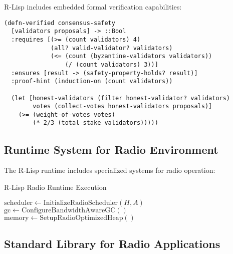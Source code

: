 \documentclass[11pt,a4paper]{article}
\begin{document}
R-Lisp includes embedded formal verification capabilities:

\begin{verbatim}
(defn-verified consensus-safety 
  [validators proposals] -> ::Bool
  :requires [(>= (count validators) 4)
             (all? valid-validator? validators)
             (<= (count (byzantine-validators validators)) 
                 (/ (count validators) 3))]
  :ensures [result -> (safety-property-holds? result)]
  :proof-hint (induction-on (count validators))
  
  (let [honest-validators (filter honest-validator? validators)
        votes (collect-votes honest-validators proposals)]
    (>= (weight-of-votes votes) 
        (* 2/3 (total-stake validators)))))
\end{verbatim}

\subsection{Runtime System for Radio Environment}

The R-Lisp runtime includes specialized systems for radio operation:

\begin{algorithm}[H]
\SetAlgoLined
{}
\caption{R-Lisp Radio Runtime Execution}

$\text{scheduler} \leftarrow \text{InitializeRadioScheduler}(H, A)$\;
$\text{gc} \leftarrow \text{ConfigureBandwidthAwareGC}()$\;
$\text{memory} \leftarrow \text{SetupRadioOptimizedHeap}()$\;

\;
\end{algorithm}

\subsection{Standard Library for Radio Applications}
\end{document}
